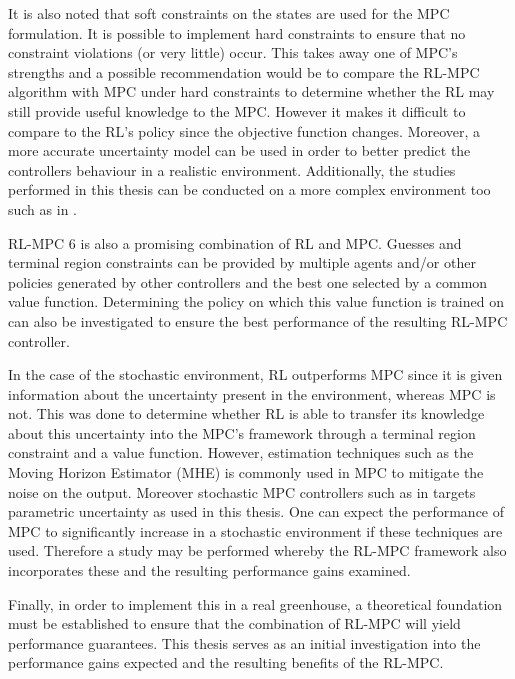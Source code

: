 It is also noted that soft constraints on the states are used for the MPC formulation. It is possible to implement hard constraints to ensure that no constraint violations (or very little) occur. This takes away one of MPC's strengths and a possible recommendation would be to compare the RL-MPC algorithm with MPC under hard constraints to determine whether the RL may still provide useful knowledge to the MPC. However it makes it difficult to compare to the RL's policy since the objective function changes. Moreover, a more accurate uncertainty model can be used in order to better predict the controllers behaviour in a realistic environment. Additionally, the studies performed in this thesis can be conducted on a more complex environment too such as in \cite{GreenLightOpenSource2020}. 

RL-MPC 6 is also a promising combination of RL and MPC. Guesses and terminal region constraints can be provided by multiple agents and/or other policies generated by other controllers and the best one selected by a common value function. Determining the policy on which this value function is trained on can also be investigated to ensure the best performance of the resulting RL-MPC controller. 

In the case of the stochastic environment, RL outperforms MPC since it is given information about the uncertainty present in the environment, whereas MPC is not. This was done to determine whether RL is able to transfer its knowledge about this uncertainty into the MPC's framework through a terminal region constraint and a value function. However, estimation techniques such as the Moving Horizon Estimator (MHE) is commonly used in MPC to mitigate the noise on the output. Moreover stochastic MPC controllers such as in \cite{boersmaRobustSamplebasedModel2022} targets parametric uncertainty as used in this thesis. One can expect the performance of MPC to significantly increase in a stochastic environment if these techniques are used. Therefore a study may be performed whereby the RL-MPC framework also incorporates these and the resulting performance gains examined. 

Finally, in order to implement this in a real greenhouse, a theoretical foundation must be established to ensure that the combination of RL-MPC will yield performance guarantees. This thesis serves as an initial investigation into the performance gains expected and the resulting benefits of the RL-MPC.
